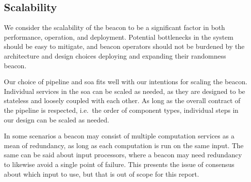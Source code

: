 \subsection{Scalability}
We consider the scalability of the beacon to be a significant factor in both performance, operation, and deployment.
Potential bottlenecks in the system should be easy to mitigate, and beacon operators should not be burdened by the architecture and design choices deploying and expanding their randomness beacon.

Our choice of pipeline and \gls{soa} fits well with our intentions for scaling the beacon.
Individual services in the \gls{soa} can be scaled as needed, as they are designed to be stateless and loosely coupled with each other.
As long as the overall contract of the pipeline is respected, i.e.\ the order of component types, individual steps in our design can be scaled as needed.

In some scenarios a beacon may consist of multiple computation services as a mean of redundancy, as long as each computation is run on the same input.
The same can be said about input processors, where a beacon may need redundancy to likewise avoid a single point of failure.
This presents the issue of consensus about which input to use, but that is out of scope for this report.

